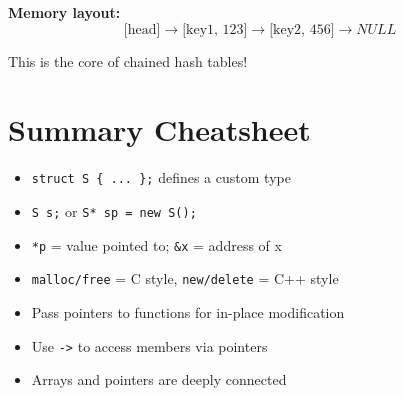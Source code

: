 \documentclass{article}
\begin{document}
\textbf{Memory layout:}
\[
\text{[head]} \rightarrow \text{[key1, 123]} \rightarrow \text{[key2, 456]} \rightarrow NULL
\]

This is the core of chained hash tables!

\section*{Summary Cheatsheet}

\begin{itemize}
    \item \texttt{struct S \{ ... \};} defines a custom type
    \item \texttt{S s;} or \texttt{S* sp = new S();}
    \item \texttt{*p} = value pointed to; \texttt{\&x} = address of x
    \item \texttt{malloc/free} = C style, \texttt{new/delete} = C++ style
    \item Pass pointers to functions for in-place modification
    \item Use \texttt{->} to access members via pointers
    \item Arrays and pointers are deeply connected
\end{itemize}
\end{document}
